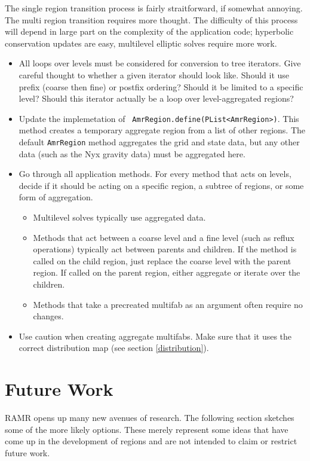 \documentclass[11pt]{article}
\newcommand{\bit}{\begin{itemize}}
\newcommand{\eit}{\end{itemize}}
\newcommand{\AR}{{\tt AmrRegion}}
\begin{document}
The single region transition process is fairly straitforward, if
somewhat annoying. The multi region transition requires more thought. 
The difficulty of this process will depend in large part on the 
complexity of the application code; hyperbolic conservation updates 
are easy, multilevel elliptic solves require more work. 
\bit
    \item All loops over levels must be considered for conversion to tree iterators. 
    Give careful thought to whether a given iterator should look like. 
    Should it use prefix (coarse then fine) or postfix ordering? 
    Should it be limited to a specific level? Should this iterator 
    actually be a loop over level-aggregated regions?
    \item Update the implemetation of {\tt 
    AmrRegion.define(PList<AmrRegion>)}. This method creates a 
    temporary aggregate region from a list of other regions. The 
    default \AR{} method aggregates the grid and state data, but any 
    other data (such as the Nyx gravity data) must be aggregated here.
    \item Go through all application methods. For every method that 
    acts on levels, decide if it should be acting on a specific 
    region, a subtree of regions, or some form of aggregation. 
    \bit
        \item Multilevel solves typically use aggregated data.
        \item Methods that act between a coarse level and a fine level 
        (such as reflux operations) typically act between parents and 
        children. If the method is called on the child region, just 
        replace the coarse level with the parent region. If called on 
        the parent region, either aggregate or iterate over the 
        children.
        \item Methods that take a precreated multifab as an argument 
        often require no changes.
    \eit
    \item Use caution when creating aggregate multifabs. Make sure 
    that it uses the correct distribution map (see section 
    \ref{distribution}).
\eit

\section{Future Work}
\label{future}

RAMR opens up many new avenues of research. The following section 
sketches some of the more likely options. These merely represent some 
ideas that have come up in the development of regions and are not 
intended to claim or restrict future work.
\end{document}
